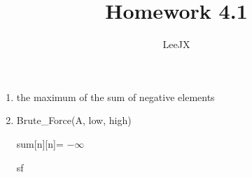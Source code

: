 \documentclass{article}
\title{Homework 4.1}
\author{LeeJX}
\begin{document}
\maketitle

\begin{enumerate}[\textbf{4.1}-1]
\item 
\par the maximum of the sum of negative elements
\item Brute\_Force(A, low, high)
\par sum[n][n]= $- \infty$
\par sf
\end{enumerate}
\end{document}
